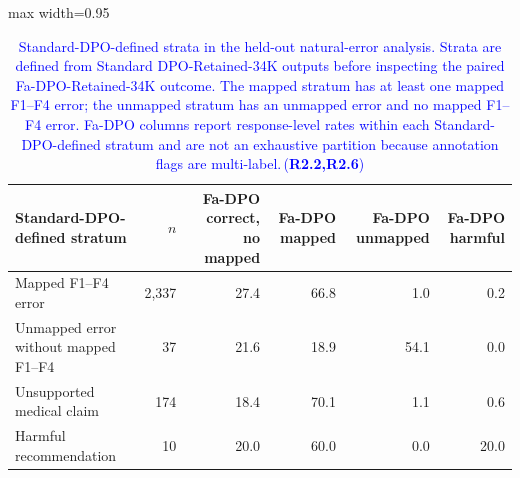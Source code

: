 \documentclass[a4paper,fleqn,doubleblind]{cas-sc}
\DeclareRobustCommand{\added}[1]{\textcolor{blue}{#1}}
\DeclareRobustCommand{\revtag}[1]{\textcolor{blue}{\scriptsize\,(\textbf{#1})}}
\begin{document}
\begin{table}[htbp]
    \centering
    \begingroup\color{blue}
    \footnotesize
    \caption{\added{Standard-DPO-defined strata in the held-out natural-error analysis. Strata are defined from Standard DPO-Retained-34K outputs before inspecting the paired Fa-DPO-Retained-34K outcome. The mapped stratum has at least one mapped F1--F4 error; the unmapped stratum has an unmapped error and no mapped F1--F4 error. Fa-DPO columns report response-level rates within each Standard-DPO-defined stratum and are not an exhaustive partition because annotation flags are multi-label.}\revtag{R2.2,R2.6}}
    \label{tab:heldout_natural_standard_strata}
    \begin{adjustbox}{max width=0.95\textwidth}
    \begin{tabular}{lrrrrr}
        \toprule
        \textbf{Standard-DPO-defined stratum} & \textbf{$n$} & \textbf{Fa-DPO correct, no mapped} & \textbf{Fa-DPO mapped} & \textbf{Fa-DPO unmapped} & \textbf{Fa-DPO harmful} \\
        \midrule
        Mapped F1--F4 error & 2,337 & 27.4 & 66.8 & 1.0 & 0.2 \\
        Unmapped error without mapped F1--F4 & 37 & 21.6 & 18.9 & 54.1 & 0.0 \\
        Unsupported medical claim & 174 & 18.4 & 70.1 & 1.1 & 0.6 \\
        Harmful recommendation & 10 & 20.0 & 60.0 & 0.0 & 20.0 \\
        \bottomrule
    \end{tabular}
    \end{adjustbox}
    \endgroup
\end{table}
\end{document}
